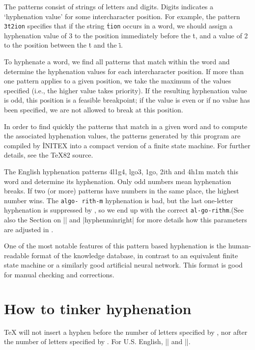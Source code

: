 The patterns consist of strings of letters and digits. Digits
indicates a `hyphenation value' for some intercharacter position.  For
example, the pattern \texttt{\.{3t2ion}} specifies that if the string \texttt{\.{tion}}
occurs in a word, we should assign a hyphenation value of 3 to the
position immediately before the \.{t}, and a value of 2 to the position
between the \.{t} and the \.{i}.

To hyphenate a word, we find all patterns that match within the word and
determine the hyphenation values for each intercharacter position.  If
more than one pattern applies to a given position, we take the maximum of
the values specified (i.e., the higher value takes priority).  If the
resulting hyphenation value is odd, this position is a feasible
breakpoint; if the value is even or if no value has been specified, we are
not allowed to break at this position.

In order to find quickly the patterns that match in a given word and to
compute the associated hyphenation values, the patterns generated by this
program are compiled by \.{INITEX} into a compact version of a finite
state machine.  For further details, see the \TeX 82 source.


The
\tex English hyphenation patterns 4l1g4, lgo3, 1go,
2ith and 4h1m match this word and determine its
hyphenation. Only odd numbers mean hyphenation
breaks. If two (or more) patterns have numbers in
the same place, the highest number wins. The \texttt{algo-
rith-m} hyphenation is bad, but the last one-letter
hyphenation is suppressed by \tex, so we end up with
the correct \texttt{al-go-rithm}.(See also the Section on |\hyphenminleft| and |hyphenminright| for more details
how this parameters are adjusted in \tex.

One of the most notable features of this pattern based
hyphenation is the human-readable format of
the knowledge database, in contrast to an equivalent
finite state machine or a similarly good artificial neural
network. This format is good for manual checking and
corrections.



\section{How to tinker hyphenation}

TeX will not insert a hyphen before the number of letters specified by ,
nor after the number of letters specified by . For U.S. English,
|| and ||. 

